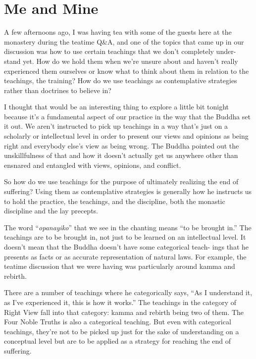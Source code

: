 
\chapter{Me and Mine}

A few afternoons ago, I was having tea with some of the guests here at the monastery during the teatime Q\&A, and one of the topics that came up in our discussion was how to use certain teachings that we don't completely under- \linebreak stand yet. How do we hold them when we're unsure about and haven't really experienced them ourselves or know what to think about them in relation to the teachings, the training? How do we use teachings as contemplative strategies rather than doctrines to believe in?

I thought that would be an interesting thing to explore a little bit tonight because it's a fundamental aspect of our practice in the way that the Buddha set it out. We aren't instructed to pick up teachings in a way that's just on a scholarly or intellectual level in order to present our views and opinions as being right and everybody else's view as being wrong. The Buddha pointed out the unskillfulness of that and how it doesn't actually get us anywhere other than ensnared and entangled with views, opinions, and conflict.

So how do we use teachings for the purpose of ultimately realizing the end of suffering? Using them as contemplative strategies is generally how he instructs us to hold the practice, the teachings, and the discipline, both the monastic discipline and the lay precepts.

The word ``\emph{opanayiko}'' that we see in the chanting means ``to be brought in.'' The teachings are to be brought in, not just to be learned on an intellectual level. It doesn't mean that the Buddha doesn't have some categorical teach- \linebreak ings that he presents as facts or as accurate representation of natural laws. For example, the teatime discussion that we were having was particularly around kamma and rebirth.{\parfillskip=0pt \par}

There are a number of teachings where he categorically says, ``As I understand it, as I've experienced it, this is how it works.'' The teachings in the category of Right View fall into that category: kamma and rebirth being two of them. The Four Noble Truths is also a categorical teaching. But even with categorical teachings, they're not to be picked up just for the sake of understanding on a conceptual level but are to be applied as a strategy for reaching the end of suffering.


